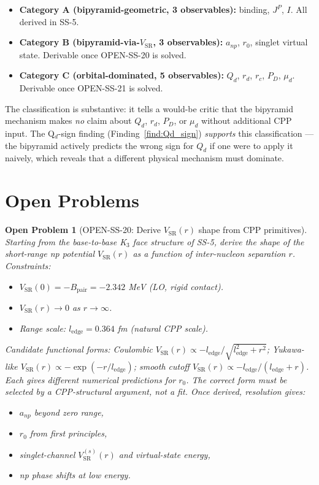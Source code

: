 \documentclass[11pt,letterpaper]{article}
\newtheorem{openproblem}{Open Problem}
\newcommand{\Bpair}{B_{\mathrm{pair}}}
\newcommand{\Qd}{Q_{d}}
\newcommand{\PD}{P_{D}}
\newcommand{\mud}{\mu_{d}}
\newcommand{\anp}{a_{np}}
\newcommand{\rzero}{r_{0}}
\newcommand{\ledge}{l_{\mathrm{edge}}}
\newcommand{\VSR}{V_{\mathrm{SR}}}
\begin{document}
\begin{itemize}
\item \textbf{Category A (bipyramid-geometric, 3 observables):} binding, $J^P$, $I$. All derived in SS-5.
\item \textbf{Category B (bipyramid-via-$\VSR$, 3 observables):} $\anp$, $\rzero$, singlet virtual state. Derivable once OPEN-SS-20 is solved.
\item \textbf{Category C (orbital-dominated, 5 observables):} $\Qd$, $r_d$, $r_c$, $\PD$, $\mud$. Derivable once OPEN-SS-21 is solved.
\end{itemize}

The classification is substantive: it tells a would-be critic that the bipyramid mechanism makes \emph{no} claim about $\Qd$, $r_d$, $\PD$, or $\mud$ without additional CPP input. The Q$_d$-sign finding (Finding~\ref{find:Qd_sign}) \emph{supports} this classification --- the bipyramid actively predicts the wrong sign for $\Qd$ if one were to apply it naively, which reveals that a different physical mechanism must dominate.

\section{Open Problems}
\label{sec:open}

\begin{openproblem}[OPEN-SS-20: Derive $\VSR(r)$ shape from CPP primitives]
\label{open:VSR}
Starting from the base-to-base K$_3$ face structure of SS-5, derive the shape of the short-range np potential $\VSR(r)$ as a function of inter-nucleon separation $r$. Constraints:
\begin{itemize}
\item $\VSR(0) = -\Bpair = -2.342$ MeV (LO, rigid contact).
\item $\VSR(r) \to 0$ as $r \to \infty$.
\item Range scale: $\ledge = 0.364$ fm (natural CPP scale).
\end{itemize}
Candidate functional forms: Coulombic $\VSR(r) \propto -\ledge/\sqrt{\ledge^2 + r^2}$; Yukawa-like $\VSR(r) \propto -\exp(-r/\ledge)$; smooth cutoff $\VSR(r) \propto -\ledge/(\ledge + r)$. Each gives different numerical predictions for $\rzero$. The correct form must be selected by a CPP-structural argument, not a fit. Once derived, resolution gives:
\begin{itemize}
\item $\anp$ beyond zero range,
\item $\rzero$ from first principles,
\item singlet-channel $\VSR^{(s)}(r)$ and virtual-state energy,
\item np phase shifts at low energy.
\end{itemize}
\end{openproblem}
\end{document}
